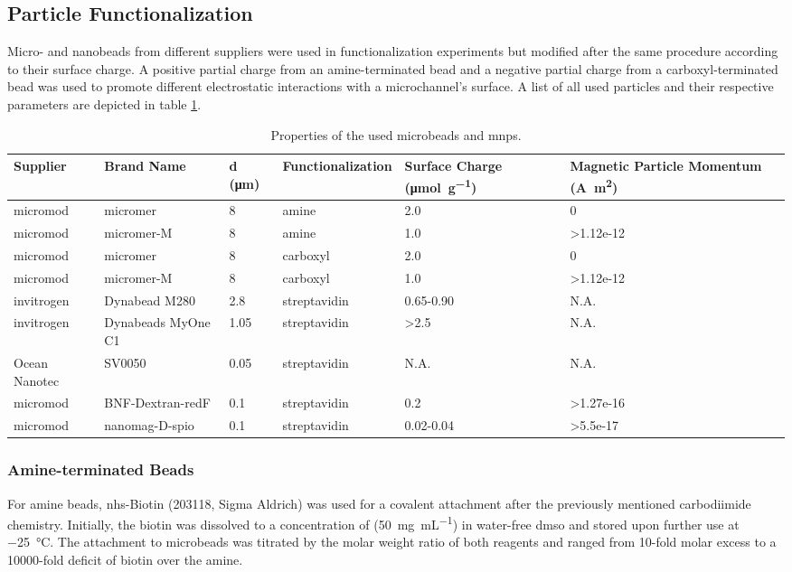\subsection{Particle Functionalization}
\label{sec:meth:particle}
Micro- and nanobeads from different suppliers were used in functionalization experiments but modified after the same procedure according to their surface charge. A positive partial charge from an \gls{amine}-terminated bead and a negative partial charge from a \gls{carboxyl}-terminated bead was used to promote different electrostatic interactions with a microchannel's surface. A list of all used particles and their respective parameters are depicted in table \ref{tab:particles}.
\begin{table}[htb]
	\normalsize
	\begin{tabularx}{\linewidth}{m{17mm}m{22mm}m{8mm}m{20mm}m{20mm}m{20mm}}
		\toprule[1pt]
		Supplier & Brand Name & d (\si{\micro\meter}) & Func\-tio\-na\-li\-za\-tion & Surface Charge (\si{\micro\mol\per\gram})  & Magnetic Particle Momentum (\si{\ampere\square\meter})\\
		\midrule
		micromod & micromer & \num{8} & \gls{amine} & \num{2.0} &  0 \\		
		micromod & micromer-M & \num{8} & \gls{amine}  & \num{1.0} & \num{>1.12e-12} \\ \addlinespace
		micromod & micromer & 8 & \gls{carboxyl} & \num{2.0} &  0\\
		micromod & micromer-M & 8 & \gls{carboxyl}  & \num{1.0} & \num{>1.12e-12}\\ \addlinespace
		invitrogen & Dynabead M280 & \num{2.8} & streptavidin & \num{.65}-\num{.90} &  N.A.\\
		invitrogen & Dynabeads MyOne C1 & \num{1.05} & streptavidin & \num{>2.5} & N.A. \\
		Ocean Nanotec &  SV0050  & \num{0.05}& streptavidin & N.A. & N.A. \\
		micromod & BNF-Dextran-redF &\num{0.1} & streptavidin &\num{0.2} & \num{>1.27e-16} \\
		micromod & nanomag-D-spio & \num{0.1} & streptavidin & \num{0.02}-\num{0.04} & \num{>5.5e-17} \\
		\bottomrule[1.2pt]
	\end{tabularx}
	\caption{Properties of the used microbeads and \glspl{mnp}.}
	\label{tab:particles}
\end{table}
\subsubsection{Amine-terminated Beads} \label{sec:meth:aminebeads}
For \gls{amine} beads, \gls{nhs}-Biotin (203118, Sigma Aldrich) was used for a covalent attachment after the previously mentioned carbodiimide chemistry. Initially, the biotin was dissolved to a concentration of (\SI{50}{\milli\gram\per\milli\liter}) in water-free \gls{dmso} and stored upon further use at \SI{-25}{\degreeCelsius}. The attachment to microbeads was titrated by the molar weight ratio of both reagents and ranged from 10-fold molar excess to a \num{10000}-fold deficit of biotin over the amine. 

